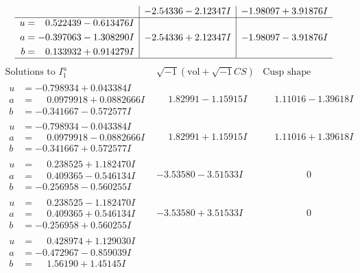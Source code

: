 \documentclass[1p]{elsarticle_modified}
\theoremstyle{definition}
\newcommand{\I}{\sqrt{-1}}
\begin{document}
$$\begin{array}{c|c|c}
 & -2.54336 - 2.12347 I & -1.98097 + 3.91876 I \\ \hline\begin{aligned}
u &= \phantom{-}0.522439 - 0.613476 I \\
a &= -0.397063 - 1.308290 I \\
b &= \phantom{-}0.133932 + 0.914279 I\end{aligned}
 & -2.54336 + 2.12347 I & -1.98097 - 3.91876 I\\
 \hline 
 \end{array}$$\newpage$$\begin{array}{c|c|c}  
\text{Solutions to }I^u_{1}& \I (\text{vol} + \sqrt{-1}CS) & \text{Cusp shape}\\
 \hline 
\begin{aligned}
u &= -0.798934 + 0.043384 I \\
a &= \phantom{-}0.0979918 + 0.0882666 I \\
b &= -0.341667 - 0.572577 I\end{aligned}
 & \phantom{-}1.82991 - 1.15915 I & \phantom{-}1.11016 - 1.39618 I \\ \hline\begin{aligned}
u &= -0.798934 - 0.043384 I \\
a &= \phantom{-}0.0979918 - 0.0882666 I \\
b &= -0.341667 + 0.572577 I\end{aligned}
 & \phantom{-}1.82991 + 1.15915 I & \phantom{-}1.11016 + 1.39618 I \\ \hline\begin{aligned}
u &= \phantom{-}0.238525 + 1.182470 I \\
a &= \phantom{-}0.409365 - 0.546134 I \\
b &= -0.256958 - 0.560255 I\end{aligned}
 & -3.53580 - 3.51533 I & \phantom{-0.000000 } 0 \\ \hline\begin{aligned}
u &= \phantom{-}0.238525 - 1.182470 I \\
a &= \phantom{-}0.409365 + 0.546134 I \\
b &= -0.256958 + 0.560255 I\end{aligned}
 & -3.53580 + 3.51533 I & \phantom{-0.000000 } 0 \\ \hline\begin{aligned}
u &= \phantom{-}0.428974 + 1.129030 I \\
a &= -0.472967 - 0.859039 I \\
b &= \phantom{-}1.56190 + 1.45145 I\end{aligned}

\end{array}$$
\end{document}
